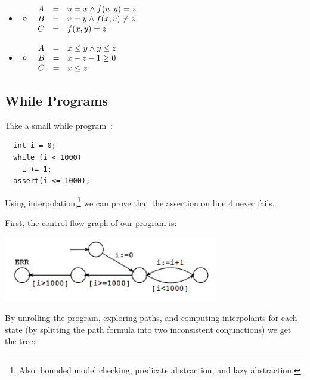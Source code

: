 \documentclass{article}
\begin{document}
\begin{itemize}
\item[]
  \begin{itemize}
  \item[]
    $\begin{array}{l l l}
      A & = & u = x \wedge f(u, y) = z
    \\B & = & v = y \wedge f(x, v) \neq z
    \\C & = & f(x,y) = z
    \end{array}$
  \end{itemize}
\item[]
  \begin{itemize}
  \item[]
    $\begin{array}{l l l}
      A & = & x \leq y \wedge y \leq z
    \\B & = & x - z - 1 \geq 0
    \\C & = & x \leq z
    \end{array}$
  \end{itemize}
\end{itemize}


\subsection{While Programs}

Take a small while program~\cite{bkrw-preprint-2010}:

\begin{lstlisting}
  int i = 0;
  while (i < 1000)
    i += 1;
  assert(i <= 1000);
\end{lstlisting}

Using interpolation,\footnote{Also: bounded model checking, predicate abstraction, and lazy abstraction.} we can prove that the assertion on line 4 never fails.

First, the control-flow-graph of our program is:

\begin{center}
  \includegraphics[scale=0.6]{src/example-cfg.png}
\end{center}

By unrolling the program, exploring paths, and computing interpolants for
 each state (by splitting the path formula into two inconsistent conjunctions) we get the tree:
\end{document}
